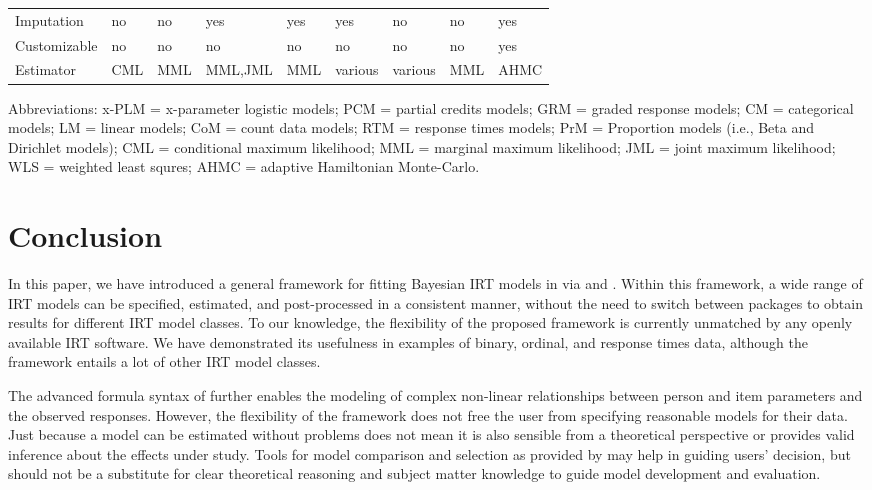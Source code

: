 \documentclass[jss]{jss}
\begin{document}
\begin{CodeChunk}
\begin{table}[t]
\begin{threeparttable}
\begin{tabular}{lllllllll}
Imputation & no & no & yes & yes & yes & no & no & yes\\
Customizable & no & no & no & no & no & no & no & yes\\
Estimator & CML & MML & MML,JML & MML & various & various & MML & AHMC\\
\bottomrule
\end{tabular}
\begin{tablenotes}
\item Abbreviations: x-PLM = x-parameter logistic models; PCM = partial credits models; GRM = graded response models; CM = categorical models; LM = linear models; CoM = count data models; RTM = response times models; PrM =  Proportion models (i.e., Beta and Dirichlet models); CML = conditional maximum likelihood; MML = marginal maximum likelihood; JML = joint maximum likelihood; WLS = weighted least squres; AHMC = adaptive Hamiltonian Monte-Carlo.
\end{tablenotes}
\end{threeparttable}
\end{table}

\end{CodeChunk}

\hypertarget{conclusion}{%
\section{Conclusion}\label{conclusion}}

In this paper, we have introduced a general framework for fitting
Bayesian IRT models in  via  and .
Within this framework, a wide range of IRT models can be specified,
estimated, and post-processed in a consistent manner, without the need
to switch between packages to obtain results for different IRT model
classes. To our knowledge, the flexibility of the proposed framework is
currently unmatched by any openly available IRT software. We have
demonstrated its usefulness in examples of binary, ordinal, and response
times data, although the framework entails a lot of other IRT model
classes.

The advanced formula syntax of  further enables the modeling
of complex non-linear relationships between person and item parameters
and the observed responses. However, the flexibility of the framework
does not free the user from specifying reasonable models for their data.
Just because a model can be estimated without problems does not mean it
is also sensible from a theoretical perspective or provides valid
inference about the effects under study. Tools for model comparison and
selection as provided by  may help in guiding users' decision,
but should not be a substitute for clear theoretical reasoning and
subject matter knowledge to guide model development and evaluation.
\end{document}
